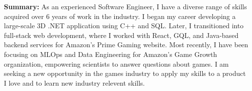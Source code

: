 \documentclass{cv}
\begin{document}
	\makecvheader

	\par{
		\textbf{Summary:} As an experienced Software Engineer, I have a diverse range of skills acquired over 6 years of work in the industry. I began my career developing a large-scale 3D .NET application using C++ and SQL. Later, I transitioned into full-stack web development, where I worked with React, GQL, and Java-based backend services for Amazon's Prime Gaming website. Most recently, I have been focusing on MLOps and Data Engineering for Amazon's Game Growth organization, empowering scientists to answer questions about games. I am seeking a new opportunity in the games industry to apply my skills to a product I love and to learn new industry relevent skills.
	}

	\bigskip
	
\end{document}
